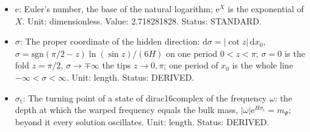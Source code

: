 \documentclass[
  10pt,
]{article}
\begin{document}
\begin{itemize}
  \(\chi_{\mathrm{b}}\): The profile of a state of dirac16complex at the
  fold (a resonance): it decays as
  \(\mathrm{e}^{-q_{\mathrm{b}}\lvert\sigma\rvert}\) out to the turning
  point and continues beyond it as an outgoing wave of exponentially
  small amplitude. Unit: GeV\(^{2}\). Status: DERIVED.
\item
  \(\mathrm{e}\): Euler's number, the base of the natural logarithm;
  \(\mathrm{e}^{X}\) is the exponential of \(X\). Unit: dimensionless.
  Value: 2.718281828. Status: STANDARD.
\item
  \(\sigma\): The proper coordinate of the hidden direction:
  \(\mathrm{d}\sigma = \lvert\cot z\rvert\,\mathrm{d}x_0\),
  \(\sigma = \mathrm{sgn}(\pi/2 - z)\ln(\sin z)/(6H)\) on one period
  \(0 < z < \pi\); \(\sigma = 0\) is the fold \(z = \pi/2\),
  \(\sigma \to \mp\infty\) the tips \(z \to 0, \pi\); one period of
  \(x_0\) is the whole line \(-\infty < \sigma < \infty\). Unit: length.
  Status: DERIVED.
\item
  \(\sigma_{\mathrm{t}}\): The turning point of a state of
  dirac16complex of the frequency \(\omega\): the depth at which the
  warped frequency equals the bulk mass,
  \(\lvert\omega\rvert\mathrm{e}^{H\sigma_{\mathrm{t}}} = m_\Psi\);
  beyond it every solution oscillates. Unit: length. Status: DERIVED.
\end{itemize}
\end{document}
